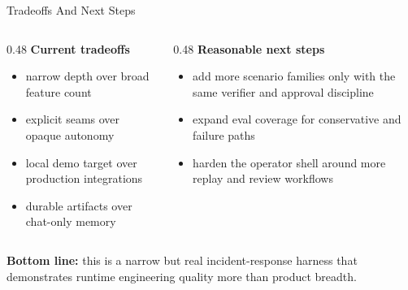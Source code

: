 \documentclass[aspectratio=169]{beamer}
\begin{document}
\begin{frame}{Tradeoffs And Next Steps}
  \begin{columns}[T]
    \begin{column}{0.48\textwidth}
      \textbf{Current tradeoffs}
      \begin{itemize}
        \item narrow depth over broad feature count
        \item explicit seams over opaque autonomy
        \item local demo target over production integrations
        \item durable artifacts over chat-only memory
      \end{itemize}
    \end{column}
    \begin{column}{0.48\textwidth}
      \textbf{Reasonable next steps}
      \begin{itemize}
        \item add more scenario families only with the same verifier and approval discipline
        \item expand eval coverage for conservative and failure paths
        \item harden the operator shell around more replay and review workflows
      \end{itemize}
    \end{column}
  \end{columns}

  \vspace{0.8em}
  \textbf{Bottom line:} this is a narrow but real incident-response harness that demonstrates
  runtime engineering quality more than product breadth.
\end{frame}
\end{document}
